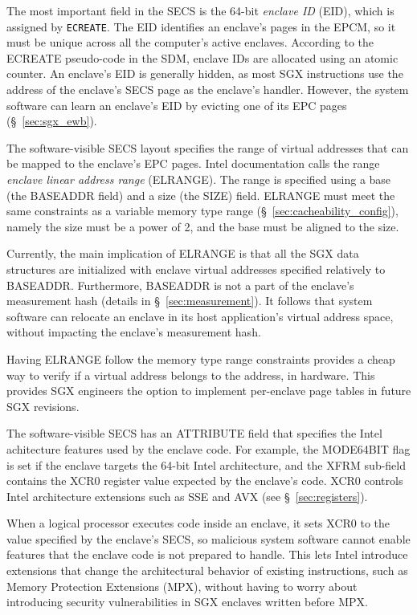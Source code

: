 The most important field in the SECS is the 64-bit \textit{enclave ID} (EID),
which is assigned by \texttt{ECREATE}. The EID identifies an enclave's pages in
the EPCM, so it must be unique across all the computer's active enclaves.
According to the ECREATE pseudo-code in the SDM, enclave IDs are allocated
using an atomic counter. An enclave's EID is generally hidden, as most SGX
instructions use the address of the enclave's SECS page as the enclave's
handler. However, the system software can learn an enclave's EID by evicting
one of its EPC pages (\S~\ref{sec:sgx_ewb}).

The software-visible SECS layout specifies the range of virtual addresses that
can be mapped to the enclave's EPC pages. Intel documentation calls the range
\textit{enclave linear address range} (ELRANGE). The range is specified using a
base (the BASEADDR field) and a size (the SIZE) field. ELRANGE must meet the
same constraints as a variable memory type range
(\S~\ref{sec:cacheability_config}), namely the size must be a power of 2, and
the base must be aligned to the size.

Currently, the main implication of ELRANGE is that all the SGX data structures
are initialized with enclave virtual addresses specified relatively to
BASEADDR. Furthermore, BASEADDR is not a part of the enclave's measurement
hash (details in \S~\ref{sec:measurement}). It follows that system software can
relocate an enclave in its host application's virtual address space, without
impacting the enclave's measurement hash.

Having ELRANGE follow the memory type range constraints provides a cheap way to
verify if a virtual address belongs to the address, in hardware. This provides
SGX engineers the option to implement per-enclave page tables in future SGX
revisions.


The software-visible SECS has an ATTRIBUTE field that specifies the Intel
achitecture features used by the enclave code. For example, the MODE64BIT flag
is set if the enclave targets the 64-bit Intel architecture, and the XFRM
sub-field contains the XCR0 register value expected by the enclave's code. XCR0
controls Intel architecture extensions such as SSE and AVX (see
\S~\ref{sec:registers}).

When a logical processor executes code inside an enclave, it sets XCR0 to the
value specified by the enclave's SECS, so malicious system software cannot
enable features that the enclave code is not prepared to handle. This lets
Intel introduce extensions that change the architectural behavior of existing
instructions, such as Memory Protection Extensions (MPX), without having to
worry about introducing security vulnerabilities in SGX enclaves written before
MPX.

